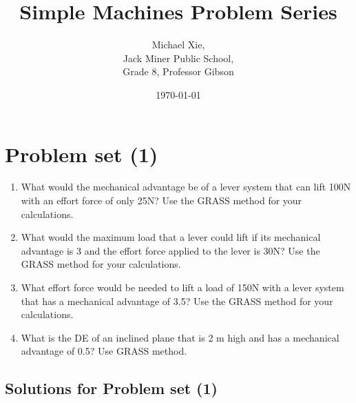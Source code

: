 \documentclass{article}
\title{Simple Machines Problem Series}
\author{Michael Xie, \\ Jack Miner Public School, \\ Grade 8, Professor Gibson}
\date{\today}
\begin{document}
\maketitle

\section*{Problem set (1)}

\begin{enumerate}
    \item What would the mechanical advantage be of a lever system that can lift 100N with an effort force of only 25N? Use the GRASS method for your calculations.
    \item What would the maximum load that a lever could lift if its mechanical advantage is 3 and the effort force applied to the lever is 30N? Use the GRASS method for your calculations.
    \item What effort force would be needed to lift a load of 150N with a lever system that has a mechanical advantage of 3.5? Use the GRASS method for your calculations.
    \item What is the DE of an inclined plane that is 2 m high and has a mechanical advantage of 0.5? Use GRASS method.
\end{enumerate}

\subsection*{Solutions for Problem set (1)}
\end{document}
